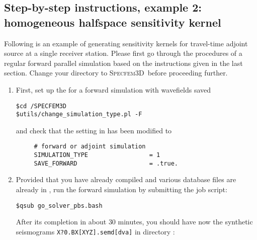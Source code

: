 \documentclass[10pt,fleqn,letterpaper]{article}
\newcommand{\specfem}{\textsc{Specfem3D}}
\begin{document}

\subsection*{Step-by-step instructions, example 2: homogeneous halfspace sensitivity kernel}
Following is an example of generating sensitivity kernels for travel-time adjoint source at a single receiver station. Please first go through the procedures of a regular forward parallel simulation based on the instructions given in the last section. Change your directory to \specfem\ before proceeding further.
\begin{enumerate}

\item  First, set up the  for a forward simulation with wavefields saved

\begin{lstlisting}
$cd /SPECFEM3D
$utils/change_simulation_type.pl -F
\end{lstlisting}
and check that the setting in  has been modified to
\begin{lstlisting}
     # forward or adjoint simulation
     SIMULATION_TYPE                 = 1
     SAVE_FORWARD                    = .true.
\end{lstlisting}

\item Provided that you have already compiled  and various database files are already in ,
  run the forward simulation by submitting the job script:
\begin{lstlisting}
$qsub go_solver_pbs.bash
\end{lstlisting}

After its completion in about $30$ minutes,  you should have now the synthetic seismograms \texttt{X?0.BX[XYZ].semd[dva]} in directory :



\end{enumerate}
\end{document}
